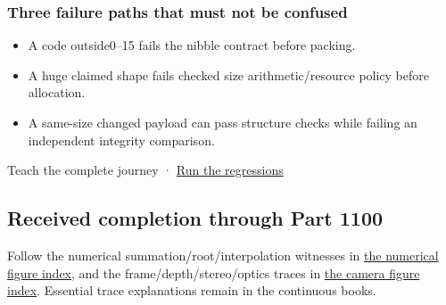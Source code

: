 \subsubsection{Three failure paths that must not be confused}\label{appendix-92ff77d4dfdc-three-failure-paths-that-must-not-be-confused}

\hypertarget{appendix-92ff77d4dfdc-three-failure-paths-that-must-not-be-confused}{}

\begin{itemize}
\tightlist
\item
  A code outside0--15 fails the nibble contract before packing.
\item
  A huge claimed shape fails checked size arithmetic/resource policy before allocation.
\item
  A same-size changed payload can pass structure checks while failing an independent integrity comparison.
\end{itemize}

{Teach the complete journey} · \hyperref[appendix-4e2236f53445-representation-codecs-and-bounded-file-laboratory]{Run the regressions}

\subsection{Received completion through Part 1100}\label{appendix-92ff77d4dfdc-received-completion-through-part-1100}

\hypertarget{appendix-92ff77d4dfdc-received-completion-through-part-1100}{}

Follow the numerical summation/root/interpolation witnesses in \hyperref[appendix-cb5af353ef77-numerical-reliability-figures-and-their-explanations]{the numerical figure index}, and the frame/depth/stereo/optics traces in \hyperref[appendix-a2b71a18f5a2-figures-and-their-full-explanations]{the camera figure index}. Essential trace explanations remain in the continuous books.
